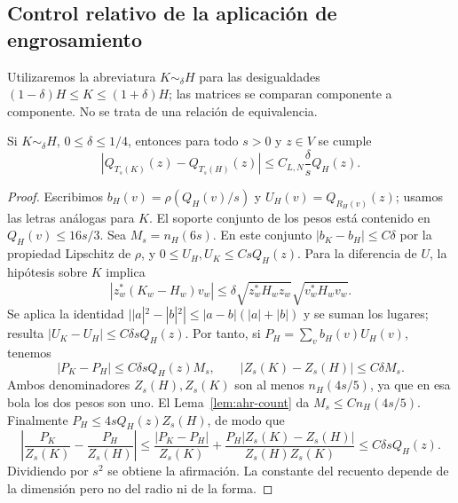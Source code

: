 \subsection{Control relativo de la aplicación de engrosamiento}

Utilizaremos la abreviatura $K\sim_\delta H$ para las desigualdades $(1-\delta)H\le K\le(1+\delta)H$; las matrices se comparan componente a componente. No se trata de una relación de equivalencia.

\begin{lema}
\label{lem:ahr-tlip}
Si $K\sim_\delta H$, $0\le\delta\le1/4$, entonces para todo $s>0$ y $z\in V$ se cumple
\begin{equation}
 |Q_{T_s(K)}(z)-Q_{T_s(H)}(z)|\le C_{L,N}\frac{\delta}{s}Q_H(z).
 \label{eq:ahr-tlip}
\end{equation}
\end{lema}
\begin{proof}
Escribimos $b_H(v)=\rho(Q_H(v)/s)$ y $U_H(v)=Q_{R_H(v)}(z)$; usamos las letras análogas para $K$. El soporte conjunto de los pesos está contenido en $Q_H(v)\le16s/3$. Sea $M_s=n_H(6s)$. En este conjunto $|b_K-b_H|\le C\delta$ por la propiedad Lipschitz de $\rho$, y $0\le U_H,U_K\le C sQ_H(z)$. Para la diferencia de $U$, la hipótesis sobre $K$ implica
\[
 |z_w^*(K_w-H_w)v_w|\le\delta\sqrt{z_w^*H_wz_w}\sqrt{v_w^*H_wv_w}.
\]
Se aplica la identidad $||a|^2-|b|^2|\le |a-b|(|a|+|b|)$ y se suman los lugares; resulta $|U_K-U_H|\le C\delta s Q_H(z)$. Por tanto, si $P_H=\sum_v b_H(v)U_H(v)$, tenemos
\[
 |P_K-P_H|\le C\delta sQ_H(z)M_s,\qquad
 |Z_s(K)-Z_s(H)|\le C\delta M_s.
\]
Ambos denominadores $Z_s(H),Z_s(K)$ son al menos $n_H(4s/5)$, ya que en esa bola los dos pesos son uno. El Lema~\ref{lem:ahr-count} da $M_s\le C n_H(4s/5)$. Finalmente $P_H\le4sQ_H(z)Z_s(H)$, de modo que
\[
 \left|\frac{P_K}{Z_s(K)}-\frac{P_H}{Z_s(H)}\right|
 \le\frac{|P_K-P_H|}{Z_s(K)}+
 \frac{P_H|Z_s(K)-Z_s(H)|}{Z_s(H)Z_s(K)}
 \le C\delta sQ_H(z).
\]
Dividiendo por $s^2$ se obtiene la afirmación. La constante del recuento depende de la dimensión pero no del radio ni de la forma.
\end{proof}

